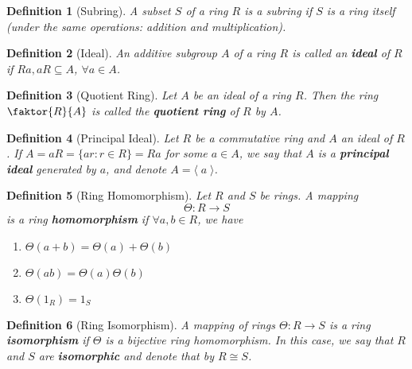 \documentclass[9pt,landscape,a4paper]{article}
\newcommand{\lra}[1]{\langle \; #1 \; \rangle}
\newcommand{\hlnoteb}[1]{\textcolor{base16-eighties-magenta}{\textbf{#1}}}
\theoremstyle{empty}
\newtheorem{defn}{Definition}
\begin{document}
\begin{multicols*}{5}
\begin{defn}[Subring]
\label{defn:subring}
A subset $S$ of a ring $R$ is a subring if $S$ is a ring itself (under the same operations: addition and multiplication).
\end{defn}

\begin{defn}[Ideal]
\label{defn:ideal}
  An additive subgroup $A$ of a ring $R$ is called an \hlnoteb{ideal} of $R$ if $Ra, aR \subseteq A$, $\forall a \in A$.
\end{defn}

\begin{defn}[Quotient Ring]
\label{defn:quotient_ring}
  Let $A$ be an ideal of a ring $R$. Then the ring $\faktor{R}{A}$ is called the \hlnoteb{quotient ring} of $R$ by $A$.
\end{defn}

\begin{defn}[Principal Ideal]
\label{defn:principal_ideal}
Let $R$ be a commutative ring and $A$ an ideal of $R$. If $A = aR = \{ ar : r \in R \} = Ra$ for some $a \in A$, we say that $A$ is a \hlnoteb{principal ideal} \textcolor{base16-eighties-blue}{generated} by $a$, and denote $A = \lra{a}$.
\end{defn}

\begin{defn}[Ring Homomorphism]
\label{defn:ring_homomorphism}
  Let $R$ and $S$ be rings. A mapping
  \begin{equation*}
    \Theta : R \to S
  \end{equation*}
  is a ring \hlnoteb{homomorphism} if $\forall a, b \in R$, we have
  \begin{enumerate}
    \item $\Theta(a + b) = \Theta(a) + \Theta(b)$
    \item $\Theta(ab) = \Theta(a) \Theta(b)$
    \item $\Theta(1_R) = 1_S$
  \end{enumerate}
\end{defn}

\begin{defn}[Ring Isomorphism]
\label{defn:ring_isomorphism}
  A mapping of rings $\Theta: R \to S$ is a ring \hlnoteb{isomorphism} if $\Theta$ is a bijective ring homomorphism. In this case, we say that $R$ and $S$ are \hlnoteb{isomorphic} and denote that by $R \cong S$.
\end{defn}


\end{multicols*}
\end{document}
